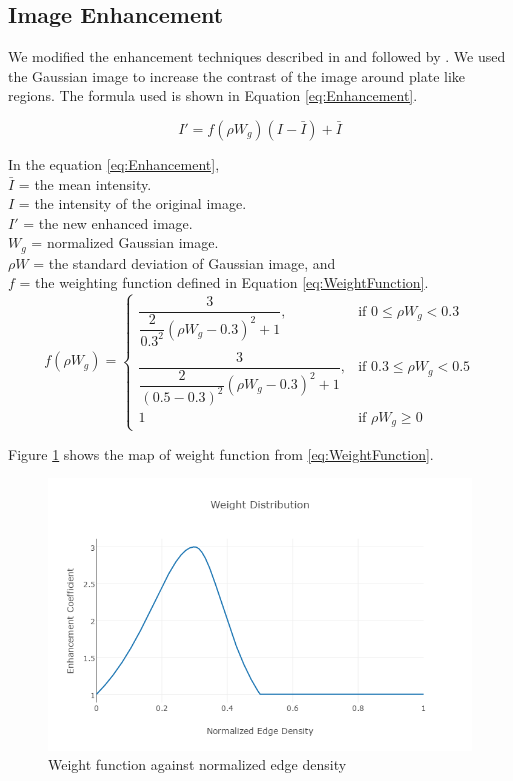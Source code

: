 \documentclass{standalone}
\begin{document}
\subsection{Image Enhancement}
We modified the enhancement techniques described in \cite{Abolghasemi2009} and \cite{zheng2005efficient} followed by \cite{joarder2012bangla}. We used the Gaussian image to increase the contrast of the image around plate like regions. The formula used is shown in Equation \ref{eq:Enhancement}.

\begin{equation} \label{eq:Enhancement}
I' = f(\rho W_g) (I - \bar{I}) + \bar{I}
\end{equation}

In the equation \ref{eq:Enhancement},\\
$\bar{I}$ = the mean intensity. \\
$I$ = the intensity of the original image. \\
$I'$ = the new enhanced image. \\
$W_g$ = normalized Gaussian image. \\ 
$\rho W$ = the standard deviation of Gaussian image, and \\
$f$ = the weighting function defined in Equation \ref{eq:WeightFunction}.
\begin{equation} \label{eq:WeightFunction}
f(\rho W_g) = 
\begin{cases} 
	\dfrac{3}{ \dfrac{2}{0.3^2} ( \rho W_g - 0.3)^2 + 1 },
    	& \mbox{if } 0 \leq \rho W_g < 0.3  
     \\
    
    \dfrac{3}{ \dfrac{2}{(0.5 - 0.3)^2} ( \rho W_g - 0.3)^2 + 1 },
    	& \mbox{if } 0.3 \leq \rho W_g < 0.5  
     \\
        
    1	& \mbox{if } \rho W_g \geq 0
\end{cases}
\end{equation} 

Figure \ref{fig:WeightDistribution} shows the map of weight function from \ref{eq:WeightFunction}.
\begin{figure}
	\centering
	\includegraphics[width=.8\linewidth]{./img/plots/weight.png}
	\caption{Weight function against normalized edge density} 
	\label{fig:WeightDistribution}
\end{figure}
\end{document}
